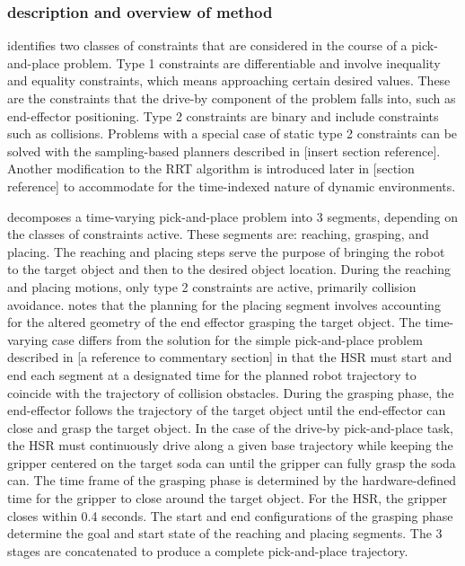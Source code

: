 \documentclass[12pt]{article}
\begin{document}
        \subsubsection{description and overview of method}
            \cite{yang_planning_2018} identifies two classes of constraints that are considered in the course of a pick-and-place problem. Type 1 constraints are differentiable and involve inequality and equality constraints, which means approaching certain desired values. These are the constraints that the drive-by component of the problem falls into, such as end-effector positioning. Type 2 constraints are binary and include constraints such as collisions. Problems with a special case of static type 2 constraints can be solved with the sampling-based planners described in [insert section reference]. Another modification to the RRT algorithm is introduced later in [section reference] to accommodate for the time-indexed nature of dynamic environments.

            \par \cite{yang_planning_2018} decomposes a time-varying pick-and-place problem into 3 segments, depending on the classes of constraints active. These segments are: reaching, grasping, and placing. The reaching and placing steps serve the purpose of bringing the robot to the target object and then to the desired object location. During the reaching and placing motions, only type 2 constraints are active, primarily collision avoidance. \cite{yang_planning_2018} notes that the planning for the placing segment involves accounting for the altered geometry of the end effector grasping the target object. The time-varying case differs from the solution for the simple pick-and-place problem described in [a reference to commentary section] in that the HSR must start and end each segment at a designated time for the planned robot trajectory to coincide with the trajectory of collision obstacles. During the grasping phase, the end-effector follows the trajectory of the target object until the end-effector can close and grasp the target object. In the case of the drive-by pick-and-place task, the HSR must continuously drive along a given base trajectory while keeping the gripper centered on the target soda can until the gripper can fully grasp the soda can. The time frame of the grasping phase is determined by the hardware-defined time for the gripper to close around the target object. For the HSR, the gripper closes within 0.4 seconds. The start and end configurations of the grasping phase determine the goal and start state of the reaching and placing segments. The 3 stages are concatenated to produce a complete pick-and-place trajectory.
\end{document}
